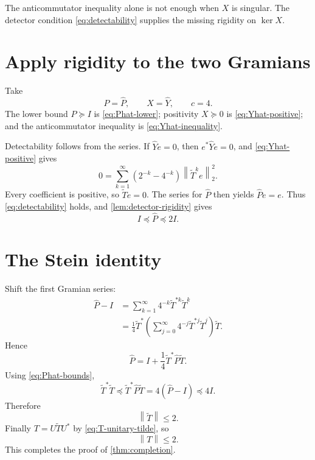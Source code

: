\documentclass[11pt,oneside,openany]{book}
\theoremstyle{definition}
\theoremstyle{remark}
\newcommand{\norm}[1]{\left\lVert #1\right\rVert}
\begin{document}
\begin{pitfall}
The anticommutator inequality alone is not enough when \(X\) is
singular.  The detector condition \eqref{eq:detectability} supplies
the missing rigidity on \(\ker X\).
\end{pitfall}

\section{Apply rigidity to the two Gramians}

Take
\[
  P=\widehat P,\qquad X=\widehat Y,\qquad c=4.
\]
The lower bound \(P\succeq I\) is \eqref{eq:Phat-lower};
positivity \(X\succeq0\) is \eqref{eq:Yhat-positive}; and the
anticommutator inequality is \eqref{eq:Yhat-inequality}.

Detectability follows from the series.  If
\(\widehat Y e=0\), then \(e^*\widehat Ye=0\), and
\eqref{eq:Yhat-positive} gives
\[
  0=\sum_{k=1}^{\infty}
  (2^{-k}-4^{-k})\norm{\widetilde T^ke}_2^2.
\]
Every coefficient is positive, so \(\widetilde Te=0\).  The series
for \(\widehat P\) then yields \(\widehat Pe=e\).
Thus \eqref{eq:detectability} holds, and
\cref{lem:detector-rigidity} gives
\begin{equation}
  I\preceq\widehat P\preceq2I.
  \label{eq:Phat-bounds}
\end{equation}

\section{The Stein identity}

Shift the first Gramian series:
\begin{align*}
  \widehat P-I
  &=\sum_{k=1}^{\infty}
    4^{-k}\widetilde T^{*k}\widetilde T^k\\
  &=\frac14\widetilde T^*
    \left(
      \sum_{j=0}^{\infty}
      4^{-j}\widetilde T^{*j}\widetilde T^j
    \right)\widetilde T.
\end{align*}
Hence
\begin{equation}
  \widehat P
  =I+\frac14\widetilde T^*\widehat P\widetilde T.
  \label{eq:stein}
\end{equation}
Using \eqref{eq:Phat-bounds},
\[
  \widetilde T^*\widetilde T
  \preceq
  \widetilde T^*\widehat P\widetilde T
  =4(\widehat P-I)
  \preceq4I.
\]
Therefore
\[
  \norm{\widetilde T}\leq2.
\]
Finally \(T=U\widetilde T U^*\) by
\eqref{eq:T-unitary-tilde}, so
\[
  \boxed{\norm{T}\leq2.}
\]
This completes the proof of \cref{thm:completion}.
\end{document}
